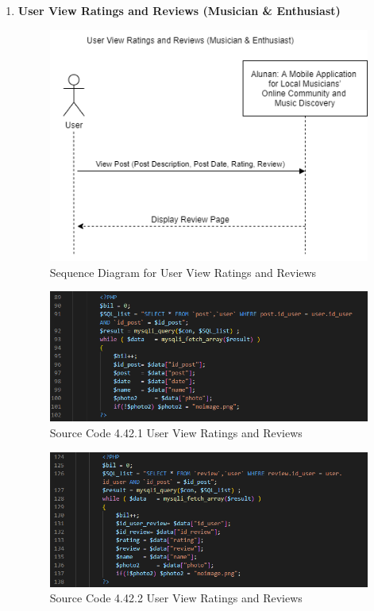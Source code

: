 \begin{enumerate}[1.]
    \item \textbf{User View Ratings and Reviews (Musician \& Enthusiast)}
    \begin{figure}[h]
        \centering
        \includegraphics[width=0.7\linewidth]{mainmatter/images/systemint/siviewratings.png}
        \caption{Sequence Diagram for User View Ratings and Reviews}
        \label{fig:myfig78}
    \end{figure}
    \begin{figure}[h]\ContinuedFloat
        \centering
        \includegraphics[width=0.8\linewidth]{mainmatter/images/systemint/codeviewreview.png}
        \caption*{Source Code 4.42.1 User View Ratings and Reviews}
        \label{fig:myfig78a}
    \end{figure}
    \begin{figure}[h]\ContinuedFloat
        \centering
        \includegraphics[width=0.8\linewidth]{mainmatter/images/systemint/codeviewreview2.png}
        \caption*{Source Code 4.42.2 User View Ratings and Reviews}
        \label{fig:myfig78b}
    \end{figure}
    \clearpage


\end{enumerate}
